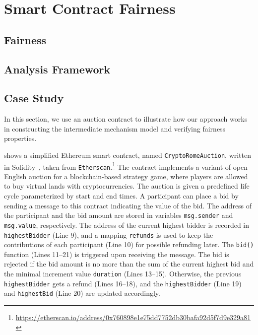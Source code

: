 \chapter{Smart Contract Fairness}
\section{Fairness}
\section{Analysis Framework}
\section{Case Study}



In this section, we use an auction contract to illustrate how our approach works in
constructing the intermediate mechanism model and verifying fairness properties.

\begin{example}\label{exp:cryptorome}
	 shows a simplified Ethereum smart contract,
	named \texttt{CryptoRomeAuction}, written in Solidity~\cite{solidity}, taken from
	\texttt{Etherscan}.\footnote{\url{https://etherscan.io/address/0x760898e1e75dd7752db30bafa92d5f7d9e329a81}}
	The contract implements a variant of open English auction for a blockchain-based strategy game,
	where players are allowed to buy virtual lands with cryptocurrencies.
	The auction is given a predefined life cycle parameterized by start and end times.
	A participant can place a bid by sending a message to this contract indicating the value of the bid.
	The address of the participant and the bid amount are stored in variables \texttt{msg.sender} and
	\texttt{msg.value}, respectively.
	The address of the current highest bidder is recorded in \texttt{highestBidder} (Line 9), and a
	mapping \texttt{refunds} is used to keep the contributions of each participant (Line 10) for
	possible refunding later.
	The \texttt{bid()} function (Lines 11--21) is triggered upon receiving the message.
	The bid is rejected if the bid amount is no more than the sum of the current highest bid
	and the minimal increment value \texttt{duration} (Lines 13--15).
	Otherwise, the previous \texttt{highestBidder} gets a refund (Lines 16--18), and the
	\texttt{highestBidder} (Line 19) and \texttt{highestBid} (Line 20) are updated accordingly.
\end{example}

